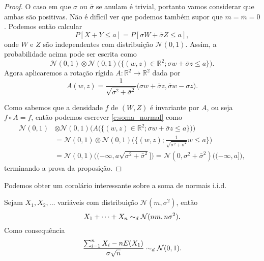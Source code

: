 \begin{proof}
  O caso em que $\sigma$ ou $\bar{\sigma}$ se anulam é trivial, portanto vamos considerar que ambas são positivas.
  Não é difícil ver que podemos também supor que $m = \bar{m} = 0$.
  Podemos então calcular
  \begin{equation}
    P[X + Y \leq a] = P[\sigma W + \bar{\sigma} Z \leq a],
  \end{equation}
  onde $W$ e $Z$ são independentes com distribuição $\mathcal{N}(0,1)$.
  Assim, a probabilidade acima pode ser escrita como
  \begin{equation}
    \label{e:soma_normal}
    \mathcal{N}(0,1) \otimes \mathcal{N}(0,1) \Big( \big\{ (w,z) \in \mathbb{R}^2; \sigma w + \bar{\sigma} z \leq a \big\} \Big).
  \end{equation}
  Agora aplicaremos a rotação rígida $A: \mathbb{R}^2 \to \mathbb{R}^2$ dada por
  \begin{equation}
    A(w,z) = \frac{1}{\sqrt{\sigma^2 + \bar{\sigma}^2}} \big( \sigma w + \bar{\sigma} z, \bar{\sigma} w - \sigma z \big).
  \end{equation}

  Como sabemos que a densidade $f$ de $(W,Z)$ é invariante por $A$, ou seja $f \circ A = f$, então podemos escrever \eqref{e:soma_normal} como
  \begin{equation*}
    \begin{split}
      \mathcal{N}(0,1) & \otimes \mathcal{N}(0,1) \Big( A \big(\big\{ (w,z) \in \mathbb{R}^2; \sigma w + \bar{\sigma} z \leq a \big\} \big) \Big)\\
      & = \mathcal{N}(0,1) \otimes \mathcal{N}(0,1) \Big( \Big\{(w,z); \frac{1}{\sqrt{\sigma^2 + \bar{\sigma}^2}}w \leq a \Big\} \Big)\\
      & = \mathcal{N}(0,1) \big( (-\infty, a \sqrt{\sigma^2 + \bar{\sigma}^2} \big] \big) = \mathcal{N}(0,\sigma^2 + \bar{\sigma}^2) \big( (-\infty, a \big] \big),
    \end{split}
  \end{equation*}
  terminando a prova da proposição.
\end{proof}

Podemos obter um corolário interessante sobre a soma de normais i.i.d.
\begin{corollary}
  \label{c:normaliz_normais}
  Sejam $X_1, X_2, \dots$ variáveis \iid com distribuição $\mathcal{N}(m,\sigma^2)$, então
  \begin{equation}
    X_1 + \dots + X_n \sim_d \mathcal{N}(nm, n \sigma^2).
  \end{equation}
  Como consequência
  \begin{equation}
    \frac{\sum_{i=1}^n X_i - n E(X_1)}{\sigma \sqrt{n}} \sim_d \mathcal{N}(0,1).
  \end{equation}
\end{corollary}

